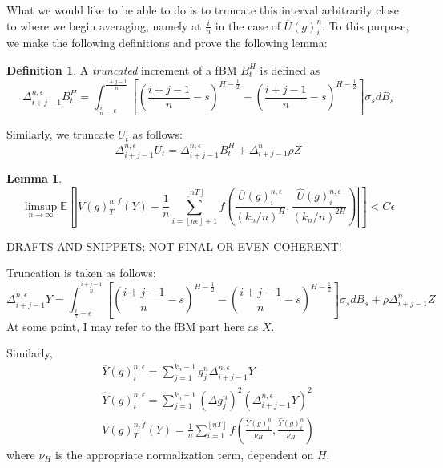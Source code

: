 \documentclass[12pt,letterpaper]{article}
\newtheorem{lemma}{Lemma}
\theoremstyle{definition}
\newtheorem*{definition}{Definition}
\newcommand{\E}{\mathbb{E}}
\begin{document}
What we would like to be able to do is to truncate this interval arbitrarily close to where we begin averaging, namely at \(\frac{i}{n}\) in the case of \(\overline{U}(g)^n_i\). To this purpose, we make the following definitions and prove the following lemma:

\begin{definition}
  A \textit{truncated} increment of a fBM \(B^H_t\) is defined as
  \begin{equation}
    \Delta_{i+j-1}^{n,\epsilon} B^H_t =  \int_{\frac{i}{n}-\epsilon}^{\frac{i+j-1}{n}} \left[ \left( \frac{i+j-1}{n} -s \right)^{H - \frac{1}{2}} - \left( \frac{i+j-1}{n} -s \right)^{H - \frac{1}{2}} \right]\sigma_s dB_s
  \end{equation}
  
  Similarly, we truncate \(U_t\) as follows:
  \begin{equation}
    \Delta_{i+j-1}^{n,\epsilon} U_t = \Delta_{i+j-1}^{n,\epsilon} B^H_t + \Delta_{i+j-1}^n \rho Z
  \end{equation}
\end{definition}

\begin{lemma}
  \begin{equation}
    \limsup_{n \rightarrow \infty} \E \left[ \left| V(g)^{n,f}_T(Y) - \frac{1}{n}\sum_{i=\left\lfloor n\epsilon \right\rfloor + 1}^{\left\lfloor nT \right\rfloor} f\left( \frac{\overline{U}(g)^{n,\epsilon}_i}{(k_n/n)^H}, \frac{\widehat{U}(g)^{n,\epsilon}_i}{(k_n/n)^{2H}} \right) \right| \right] < C\epsilon
  \end{equation} 
\end{lemma}

\pagebreak
DRAFTS AND SNIPPETS: NOT FINAL OR EVEN COHERENT!

Truncation is taken as follows:
\begin{equation}
  \Delta_{i+j-1}^{n,\epsilon} Y =  \int_{\frac{i}{n}-\epsilon}^{\frac{i+j-1}{n}} \left[ \left( \frac{i+j-1}{n} -s \right)^{H - \frac{1}{2}} - \left( \frac{i+j-1}{n} -s \right)^{H - \frac{1}{2}} \right]\sigma_s dB_s + \rho\Delta_{i+j-1}^n Z
\end{equation}
At some point, I may refer to the fBM part here as \(X\).

Similarly,
\begin{gather}
  \overline{Y}(g)^{n,\epsilon}_i = \sum_{j=1}^{k_n-1} g^n_j \Delta_{i+j-1}^{n,\epsilon} Y \\
  \widehat{Y}(g)^{n,\epsilon}_i = \sum_{j=1}^{k_n-1} (\Delta g^n_j)^2 (\Delta_{i+j-1}^{n,\epsilon} Y)^2 \\
  V(g)^{n,f}_T(Y) = \frac{1}{n}\sum_{i=1}^{\left\lfloor nT \right\rfloor} f\left( \frac{\overline{Y}(g)^n_i}{\nu_H}, \frac{\widehat{Y}(g)^n_i}{\nu_H} \right)
\end{gather}
where \(\nu_H\) is the appropriate normalization term, dependent on \(H\).
\end{document}

